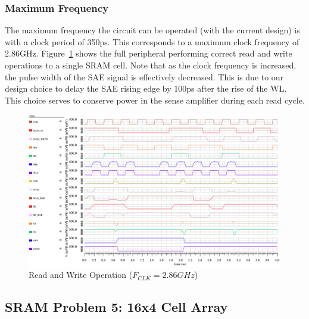 \documentclass[10pt,letterpaper,onecolumn]{article}
\begin{document}
\subsubsection{Maximum Frequency}
The maximum frequency the circuit can be operated (with the current design) is with a clock period of 350ps. This corresponds to a maximum clock frequency of 2.86GHz. Figure~\ref{fig:max_freq} shows the full peripheral performing correct read and write operations to a single SRAM cell. Note that as the clock frequency is increased, the pulse width of the SAE signal is effectively decreased. This is due to our design choice to delay the SAE rising edge by 100ps after the rise of the WL. This choice serves to conserve power in the sense amplifier during each read cycle.

\begin{figure}[h!]
\centering
\includegraphics[clip,width=0.9\columnwidth]{Problem4-MaxFreq.png}
\caption{Read and Write Operation ($F_{CLK} = 2.86GHz$)}
\label{fig:max_freq}
\end{figure}

\clearpage
\begin{center}
\section{SRAM Problem 5: 16x4 Cell Array}
\end{center}
\end{document}
